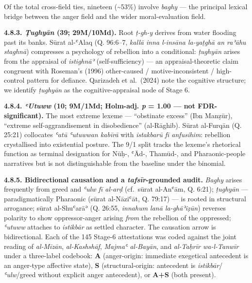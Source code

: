 \documentclass[11pt,a4paper]{article}
\begin{document}
Of the total cross-field ties, nineteen (\textasciitilde53\%) involve
\emph{baghy} --- the principal lexical bridge between the anger field
and the wider moral-evaluation field.

\textbf{4.8.3. \emph{Ṭughyān} (39; 29M/10Md).} Root \emph{ṭ-gh-y}
derives from water flooding past its banks. Sūrat al-ʿAlaq (Q. 96:6--7,
\emph{kallā inna l-insāna la-yaṭghā an raʾāhu staghnā}) compresses a
psychology of rebellion into a conditional: \emph{ṭughyān} arises from
the appraisal of \emph{istighnāʾ} (self-sufficiency) --- an
appraisal-theoretic claim congruent with Roseman's (1996) other-caused /
motive-inconsistent / high-control pattern for defiance. Qarizadeh et
al.~(2024) note the cognitive structure; we identify \emph{ṭughyān} as
the cognitive-appraisal node of Stage 6.

\textbf{4.8.4. \emph{ʿUtuww} (10; 9M/1Md; Holm-adj. \emph{p} = 1.00 ---
not FDR-significant).} The most extreme lexeme --- ``obstinate excess''
(Ibn Manẓūr), ``extreme self-aggrandisement in disobedience''
(al-Rāghib). Sūrat al-Furqān (Q. 25:21) collocates \emph{ʿatū ʿutuwwan
kabīrā} with \emph{istakbarū fī anfusihim}: rebellion crystallised into
existential posture. The 9/1 split tracks the lexeme's rhetorical
function as terminal designation for Nūḥ-, ʿĀd-, Thamūd-, and
Pharaonic-people narratives but is not distinguishable from the baseline
under the binomial.

\textbf{4.8.5. Bidirectional causation and a \emph{tafsīr}-grounded
audit.} \emph{Baghy} arises frequently from greed and \emph{ʿulw fī
al-arḍ} (cf.~sūrat al-Anʿām, Q. 6:21); \emph{ṭughyān} ---
paradigmatically Pharaonic (sūrat al-Nāziʿāt, Q. 79:17) --- is rooted in
structural arrogance; sūrat al-Shuʿarāʾ (Q. 26:55, \emph{innahum lanā
la-ghāʾiẓūn}) reverses polarity to show oppressor-anger arising
\emph{from} the rebellion of the oppressed; \emph{ʿutuww} attaches to
\emph{istikbār} as settled character. The causation arrow is
bidirectional. Each of the 145 Stage-6 attestations was coded against
the joint reading of \emph{al-Mīzān}, \emph{al-Kashshāf}, \emph{Majmaʿ
al-Bayān}, and \emph{al-Taḥrīr wa-l-Tanwīr} under a three-label
codebook: \textbf{A} (anger-origin: immediate exegetical antecedent is
an anger-type affective state), \textbf{S} (structural-origin:
antecedent is \emph{istikbār}/\emph{ʿulw}/greed without explicit anger
antecedent), or \textbf{A+S} (both present).
\end{document}
